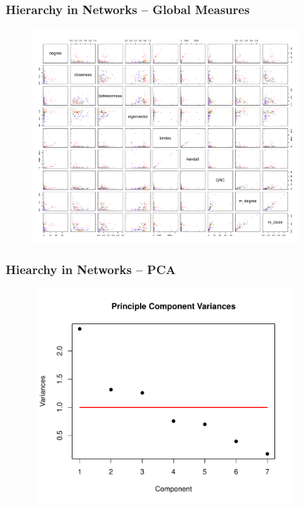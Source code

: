 \documentclass{beamer}
\newenvironment{changemargin}[2]{%
	\begin{list}{}{%
			\setlength{\topsep}{0pt}%
			\setlength{\leftmargin}{#1}%
			\setlength{\rightmargin}{#2}%
			\setlength{\listparindent}{\parindent}%
			\setlength{\itemindent}{\parindent}%
			\setlength{\parsep}{\parskip}%
		}%
		\item[]}{\end{list}}
\begin{document}
\begin{frame}\frametitle{Hierarchy in Networks -- Global Measures}
	\begin{changemargin}{-2cm}{ -2cm}
		\centering
		\includegraphics[width=12cm, height=8cm]{images/Global_Measure_Pairs_Plots.pdf}
	\end{changemargin}
\end{frame}

\begin{frame}\frametitle{Hiearchy in Networks -- PCA}
	\begin{changemargin}{-2cm}{ -2cm}
		\centering
		\includegraphics[width=12cm, height=8cm]{images/Observed_PCA_Component_Varinces.pdf}
	\end{changemargin}
\end{frame}
\end{document}

